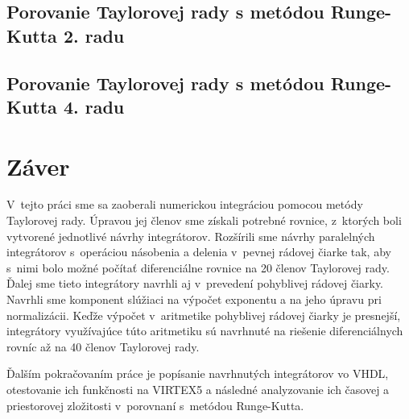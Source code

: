 \section{Porovanie Taylorovej rady s metódou Runge-Kutta 2. radu}
\section{Porovanie Taylorovej rady s metódou Runge-Kutta 4. radu}

\chapter{Záver}
V~tejto práci sme sa zaoberali numerickou integráciou pomocou metódy Taylorovej rady. Úpravou jej členov sme získali potrebné rovnice, z~ktorých boli vytvorené jednotlivé návrhy integrátorov.
Rozšírili sme návrhy paralelných integrátorov s~operáciou násobenia a delenia v~pevnej rádovej čiarke tak, aby s~nimi bolo možné počítať diferenciálne rovnice na 20 členov Taylorovej rady. Ďalej sme tieto integrátory navrhli aj v~prevedení pohyblivej rádovej čiarky. Navrhli sme komponent slúžiaci na výpočet exponentu a na jeho úpravu pri normalizácii. Keďže výpočet v~aritmetike pohyblivej rádovej čiarky je presnejší, integrátory využívajúce túto aritmetiku sú navrhnuté na riešenie diferenciálnych rovníc až na 40 členov Taylorovej rady.

Ďalším pokračovaním práce je popísanie navrhnutých integrátorov vo VHDL, otestovanie ich funkčnosti na VIRTEX5 a následné analyzovanie ich časovej a priestorovej zložitosti v~porovnaní s~metódou Runge-Kutta.

